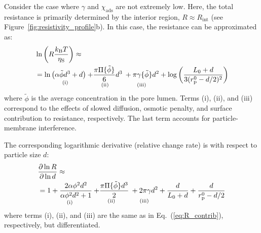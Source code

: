 \documentclass[12pt, a4paper]{article}
\begin{document}
Consider the case where $\gamma$ and $\chi_{\text{ads}}$ are not extremely low.
Here, the total resistance is primarily determined by the interior region, $R \approx R_{\text{int}}$ (see Figure~\ref{fig:resistivity_profile}b).
In this case, the resistance can be approximated as:
\begin{equation}
    \begin{aligned}
        &\ln \left(R \frac{k_{\text{B}} T}{\eta_{\text{S}}}\right) \approx 
        \\
        &
        =\underset{\text{(i)}}{ \ln\left(\alpha\tilde{\phi}d^3+d\right)}
        \underset{\text{(ii)}}{+ \frac{\pi \Pi\{\tilde{\phi}\}}{6} d^3}
        \underset{\text{(iii)}}{\vphantom{\frac{a}{a}}+ \pi \gamma\{\tilde{\phi}\} d^2}
        +  \log\left(\frac{L_0+d}{3(r_{\text{p}}^0 - d/2)^{2}}\right)
    \end{aligned}
    \label{eq:R_contrib}
\end{equation}
where $\tilde{\phi}$ is the average concentration in the pore lumen.
Terms (i), (ii), and (iii) correspond to the effects of slowed diffusion, osmotic penalty, and surface contribution to resistance, respectively.
The last term accounts for particle-membrane interference.

The corresponding logarithmic derivative (relative change rate) is with respect to particle size $d$:
\begin{equation}
    \begin{aligned}
        &\frac{\partial \ln R}{\partial \ln d} \approx 
        \\
        &
        =\underset{\text{(i)}}{ 1 +\frac{2 \alpha \phi^{2} d^{2}}{\alpha \phi^{2} d^{2} + 1}}
        \underset{\text{(ii)}}{+ \frac{\pi \Pi\{\tilde{\phi}\} d^{3}}{2}}
        \underset{\text{(iii)}}{\vphantom{\frac{a}{a}} + 2 \pi \gamma d^{2}}
        +  \frac{d}{L_0+d} + \frac{d}{r_{\text{p}}^0 - d/2}
    \end{aligned}
    \label{eq:R_contrib_deriv}
\end{equation}
where terms (i), (ii), and (iii) are the same as in Eq.~(\ref{eq:R_contrib}), respectively, but differentiated.
\end{document}
